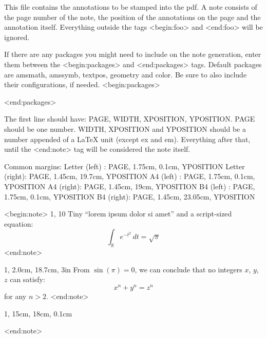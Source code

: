 This file contains the annotations to be stamped into the pdf.
A note consists of the page number of the note, the position of the
annotations on the page and the annotation itself.
Everything outside the tags <begin:foo> and <end:foo> will be ignored.


If there are any packages you might need to include on the note generation,
enter them between the <begin:packages> and <end:packages> tags.
Default packages are amsmath, amssymb, textpos, geometry and color.
Be sure to also include their configurations, if needed.
<begin:packages>
\usepackage{tikz}
<end:packages>


The first line should have: PAGE, WIDTH, XPOSITION, YPOSITION.
PAGE should be one number. WIDTH, XPOSITION and YPOSITION should be a number appended of a LaTeX unit (except ex and em). 
Everything after that, until the <end:note> tag will be considered the note itself.

Common margins:
Letter (left) : PAGE, 1.75cm, 0.1cm, YPOSITION
Letter (right): PAGE, 1.45cm, 19.7cm, YPOSITION
A4     (left) : PAGE, 1.75cm, 0.1cm, YPOSITION 
A4     (right): PAGE, 1.45cm, 19cm, YPOSITION 
B4     (left) : PAGE, 1.75cm, 0.1cm, YPOSITION 
B4     (right): PAGE, 1.45cm, 23.05cm, YPOSITION 

<begin:note>
1, 10%
\tiny Tiny ``lorem ipsum dolor si amet'' and a script-sized equation: \\
\scriptsize
\[\int_{\mathbb{R}} e^{-t^2} \, dt = \sqrt{\pi}\]
<end:note>

1, 2.0cm, 18.7cm, 3in
\scriptsize From $\sin(\pi) = 0$, we can conclude that no integers $x$, $y$, $z$
can satisfy: \[x^n + y^n = z^n\] for any $n > 2$.
<end:note>

1, 15cm, 18cm, 0.1cm
<end:note>
